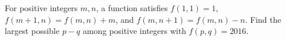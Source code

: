 For positive integers $m,n$, a function satisfies $f(1,1)=1$, $f(m+1,n)=f(m,n)+m$, and $f(m,n+1)=f(m,n)-n$. Find the largest possible $p-q$ among positive integers with $f(p,q)=2016$.

